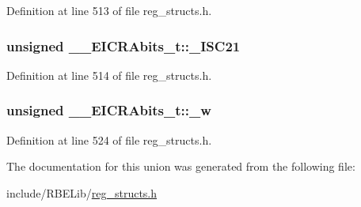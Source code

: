 Definition at line 513 of file reg\+\_\+structs.\+h.

\hypertarget{union_____e_i_c_r_abits__t_a68721495d127ebd9746cea6edd32d068}{
\subsubsection[{\+\_\+\+I\+S\+C21}]{\setlength{\rightskip}{0pt plus 5cm}unsigned \+\_\+\+\_\+\+E\+I\+C\+R\+Abits\+\_\+t\+::\+\_\+\+I\+S\+C21}}\label{union_____e_i_c_r_abits__t_a68721495d127ebd9746cea6edd32d068}


Definition at line 514 of file reg\+\_\+structs.\+h.

\hypertarget{union_____e_i_c_r_abits__t_a44df575516c86af2141d8ba966b97db8}{
\subsubsection[{\+\_\+w}]{\setlength{\rightskip}{0pt plus 5cm}unsigned \+\_\+\+\_\+\+E\+I\+C\+R\+Abits\+\_\+t\+::\+\_\+w}}\label{union_____e_i_c_r_abits__t_a44df575516c86af2141d8ba966b97db8}


Definition at line 524 of file reg\+\_\+structs.\+h.



The documentation for this union was generated from the following file\+:\begin{DoxyCompactItemize}
\item 
include/\+R\+B\+E\+Lib/\hyperlink{reg__structs_8h}{reg\+\_\+structs.\+h}\end{DoxyCompactItemize}
